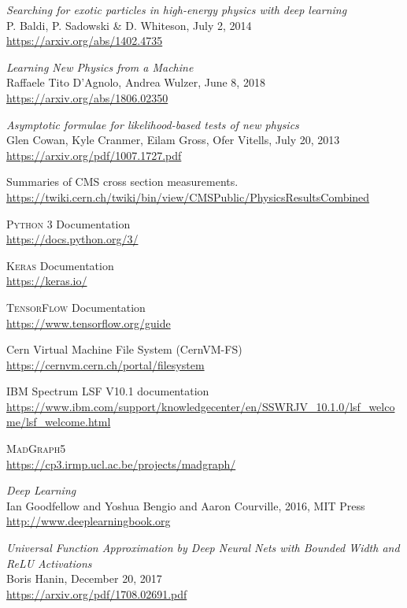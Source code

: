 \begin{thebibliography}{99}
\textit{Searching for exotic particles in high-energy physics with deep learning}
\\P. Baldi, P. Sadowski \& D. Whiteson, July 2, 2014
\\\url{https://arxiv.org/abs/1402.4735}

\textit{Learning New Physics from a Machine}
\\Raffaele Tito D'Agnolo, Andrea Wulzer, June 8, 2018
\\\url{https://arxiv.org/abs/1806.02350}

\textit{Asymptotic formulae for likelihood-based tests of new physics}
\\Glen Cowan, Kyle Cranmer, Eilam Gross, Ofer Vitells, July 20, 2013
\\\url{https://arxiv.org/pdf/1007.1727.pdf}

Summaries of CMS cross section measurements.
\\\url{https://twiki.cern.ch/twiki/bin/view/CMSPublic/PhysicsResultsCombined}

\textsc{Python 3} Documentation
\\\url{https://docs.python.org/3/}

\textsc{Keras} Documentation 
\\\url{https://keras.io/}
 
\textsc{TensorFlow} Documentation 
\\\url{https://www.tensorflow.org/guide}

Cern Virtual Machine File System (CernVM-FS)
\\\url{https://cernvm.cern.ch/portal/filesystem}

IBM Spectrum LSF V10.1 documentation
\\\url{https://www.ibm.com/support/knowledgecenter/en/SSWRJV_10.1.0/lsf_welcome/lsf_welcome.html}

\textsc{MadGraph5}
\\\url{https://cp3.irmp.ucl.ac.be/projects/madgraph/}
 
\textit{Deep Learning}
\\Ian Goodfellow and Yoshua Bengio and Aaron Courville, 2016, MIT Press
\\\url{http://www.deeplearningbook.org}

\textit{Universal Function Approximation by Deep Neural Nets with Bounded Width and ReLU Activations}
\\Boris Hanin, December 20, 2017
\\\url{https://arxiv.org/pdf/1708.02691.pdf}


\end{thebibliography}
